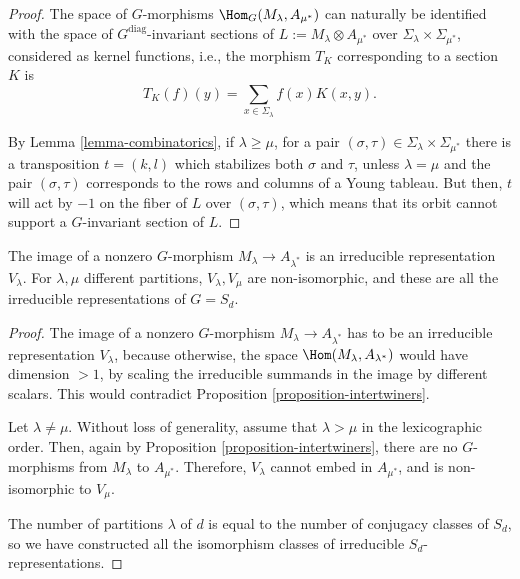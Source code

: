 \begin{proof}
The space of $G$-morphisms $\Hom_G(M_\lambda, A_{\mu^*})$ can naturally be identified with the space of $G^{\text{diag}}$-invariant sections of $L:=M_\lambda\otimes A_{\mu^*}$ over $\Sigma_\lambda\times\Sigma_{\mu^*}$, considered as kernel functions, i.e., the morphism $T_K$ corresponding to a section $K$ is
$$ T_K (f) (y) = \sum_{x\in \Sigma_\lambda} f(x) K(x,y).$$

By Lemma \ref{lemma-combinatorics}, if $\lambda \ge \mu$, for a pair $(\sigma,\tau) \in \Sigma_\lambda \times \Sigma_{\mu^*}$ there is a transposition $t=(k,l)$ which stabilizes both $\sigma$ and $\tau$, unless $\lambda=\mu$ and the pair $(\sigma,\tau)$ corresponds to the rows and columns of a Young tableau. But then, $t$ will act by $-1$ on the fiber of $L$ over $(\sigma,\tau)$, which means that its orbit cannot support a $G$-invariant section of $L$. 
\end{proof}


\begin{theorem}
\label{theorem-irreducibles-symmetric}
The image of a nonzero $G$-morphism $M_\lambda \to A_{\lambda^*}$ is an irreducible representation $V_\lambda$. For $\lambda, \mu$ different partitions, $V_\lambda, V_\mu$ are non-isomorphic, and these are all the irreducible representations of $G=S_d$.
\end{theorem}

\begin{proof}
The image of a nonzero $G$-morphism $M_\lambda \to A_{\lambda^*}$ has to be an irreducible representation $V_\lambda$, because otherwise, the space $\Hom(M_\lambda, A_{\lambda^*})$ would have dimension $>1$, by scaling the irreducible summands in the image by different scalars. This would contradict Proposition \ref{proposition-intertwiners}.
 
Let $\lambda\ne \mu$. Without loss of generality, assume that $\lambda >\mu$ in the lexicographic order. Then, again by Proposition \ref{proposition-intertwiners}, there are no $G$-morphisms from $M_\lambda$ to $A_{\mu^*}$. Therefore, $V_\lambda$ cannot embed in $A_{\mu^*}$, and is non-isomorphic to $V_\mu$. 

The number of partitions $\lambda$ of $d$ is equal to the number of conjugacy classes of $S_d$, so we have constructed all the isomorphism classes of irreducible $S_d$-representations.
\end{proof}





